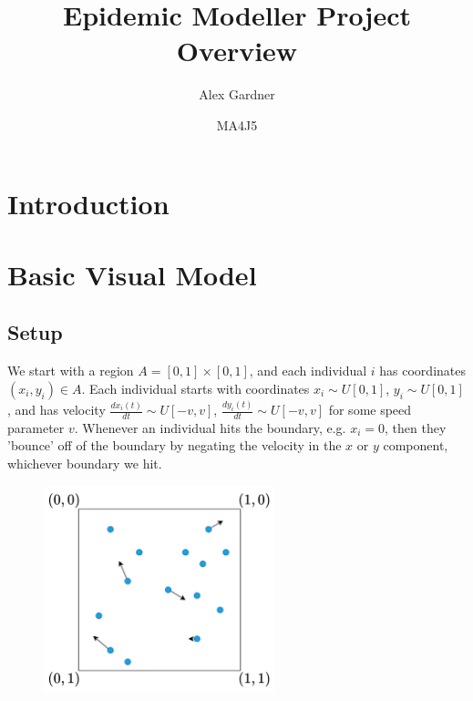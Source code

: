 \documentclass[11pt]{article}
\begin{document}
\title{Epidemic Modeller Project Overview}
\author{Alex Gardner}
\date{MA4J5}
\maketitle

\section*{Introduction}

\section*{Basic Visual Model}
\subsection*{Setup}
We start with a region $A=[0,1]\times [0,1]$, and each individual $i$ has coordinates $(x_i, y_i)\in A$. Each individual starts with coordinates $x_i \sim U[0,1]$, $y_i \sim U[0,1]$, and has velocity $\frac{dx_i(t)}{dt} \sim U[-v,v]$, $\frac{dy_i(t)}{dt} \sim U[-v,v]$ for some speed parameter $v$. Whenever an individual hits the boundary, e.g. $x_i=0$, then they 'bounce' off of the boundary by negating the velocity in the $x$ or $y$ component, whichever boundary we hit.

\begin{figure}[H]
\label{BasicModelDiagram}
\begin{center}
\includegraphics[width=0.6\textwidth]{BasicModelDiagram1}
\end{center}
\end{figure}
\end{document}
